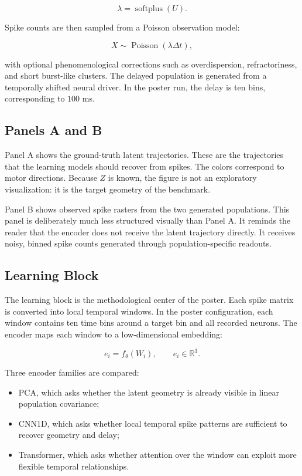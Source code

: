 \documentclass[11pt]{article}
\begin{document}
\begin{equation}
\lambda = \operatorname{softplus}(U).
\end{equation}

Spike counts are then sampled from a Poisson observation model:

\begin{equation}
X \sim \operatorname{Poisson}(\lambda \Delta t),
\end{equation}

with optional phenomenological corrections such as overdispersion,
refractoriness, and short burst-like clusters. The delayed population is
generated from a temporally shifted neural driver. In the poster run, the
delay is ten bins, corresponding to $100$ ms.

\subsection{Panels A and B}

Panel A shows the ground-truth latent trajectories. These are the trajectories
that the learning models should recover from spikes. The colors correspond to
motor directions. Because $Z$ is known, the figure is not an exploratory
visualization: it is the target geometry of the benchmark.

Panel B shows observed spike rasters from the two generated populations. This
panel is deliberately much less structured visually than Panel A. It reminds
the reader that the encoder does not receive the latent trajectory directly.
It receives noisy, binned spike counts generated through population-specific
readouts.

\subsection{Learning Block}

The learning block is the methodological center of the poster. Each spike
matrix is converted into local temporal windows. In the poster configuration,
each window contains ten time bins around a target bin and all recorded neurons.
The encoder maps each window to a low-dimensional embedding:

\begin{equation}
e_i = f_\theta(W_i),
\qquad
e_i \in \mathbb{R}^{3}.
\end{equation}

Three encoder families are compared:

\begin{itemize}
    \item PCA, which asks whether the latent geometry is already visible in
    linear population covariance;
    \item CNN1D, which asks whether local temporal spike patterns are
    sufficient to recover geometry and delay;
    \item Transformer, which asks whether attention over the window can exploit
    more flexible temporal relationships.
\end{itemize}
\end{document}
